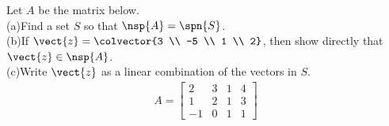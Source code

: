 Let $A$ be the matrix below.\\
(a)\quad Find a set $S$ so that $\nsp{A}=\spn{S}$.\\
(b)\quad If $\vect{z}=\colvector{3 \\ -5 \\ 1 \\ 2}$, then show directly that $\vect{z}\in\nsp{A}$.\\
(c)\quad Write $\vect{z}$ as a linear combination of the vectors in $S$.
%
\begin{align*}
A=
\begin{bmatrix}
 2 & 3 & 1 & 4 \\
 1 & 2 & 1 & 3 \\
 -1 & 0 & 1 & 1
\end{bmatrix}
\end{align*}
